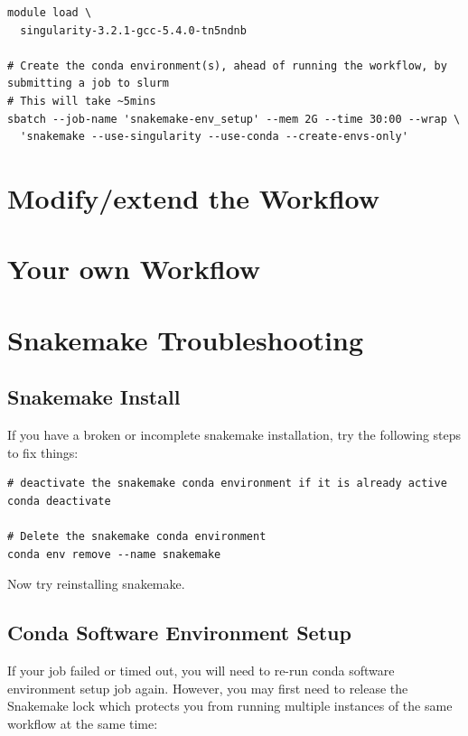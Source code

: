 \begin{lstlisting}
module load \
  singularity-3.2.1-gcc-5.4.0-tn5ndnb

# Create the conda environment(s), ahead of running the workflow, by submitting a job to slurm
# This will take ~5mins
sbatch --job-name 'snakemake-env_setup' --mem 2G --time 30:00 --wrap \
  'snakemake --use-singularity --use-conda --create-envs-only'
\end{lstlisting}




\section{Modify/extend the Workflow}

\section{Your own Workflow}

\section{Snakemake Troubleshooting}
\label{sec:snake_trouble}

\subsection{Snakemake Install}

If you have a broken or incomplete snakemake installation, try the following steps to fix things:

\begin{lstlisting}
# deactivate the snakemake conda environment if it is already active
conda deactivate

# Delete the snakemake conda environment
conda env remove --name snakemake
\end{lstlisting}

Now try reinstalling snakemake.

\subsection{Conda Software Environment Setup}

If your job failed or timed out, you will need to re-run conda software environment setup job again. However, you may first need to release the
Snakemake lock which protects you from running multiple instances of the same workflow at the same time:

